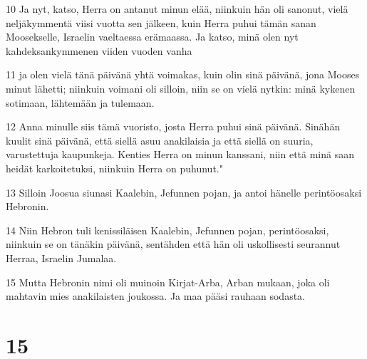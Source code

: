 \par 10 Ja nyt, katso, Herra on antanut minun elää, niinkuin hän oli sanonut, vielä neljäkymmentä viisi vuotta sen jälkeen, kuin Herra puhui tämän sanan Moosekselle, Israelin vaeltaessa erämaassa. Ja katso, minä olen nyt kahdeksankymmenen viiden vuoden vanha
\par 11 ja olen vielä tänä päivänä yhtä voimakas, kuin olin sinä päivänä, jona Mooses minut lähetti; niinkuin voimani oli silloin, niin se on vielä nytkin: minä kykenen sotimaan, lähtemään ja tulemaan.
\par 12 Anna minulle siis tämä vuoristo, josta Herra puhui sinä päivänä. Sinähän kuulit sinä päivänä, että siellä asuu anakilaisia ja että siellä on suuria, varustettuja kaupunkeja. Kenties Herra on minun kanssani, niin että minä saan heidät karkoitetuksi, niinkuin Herra on puhunut."
\par 13 Silloin Joosua siunasi Kaalebin, Jefunnen pojan, ja antoi hänelle perintöosaksi Hebronin.
\par 14 Niin Hebron tuli kenissiläisen Kaalebin, Jefunnen pojan, perintöosaksi, niinkuin se on tänäkin päivänä, sentähden että hän oli uskollisesti seurannut Herraa, Israelin Jumalaa.
\par 15 Mutta Hebronin nimi oli muinoin Kirjat-Arba, Arban mukaan, joka oli mahtavin mies anakilaisten joukossa. Ja maa pääsi rauhaan sodasta.

\chapter{15}

